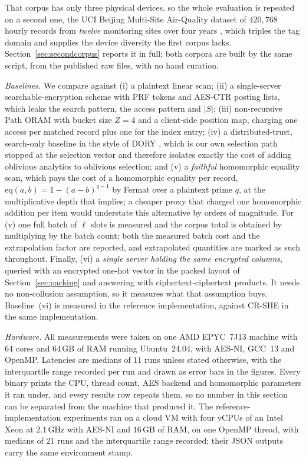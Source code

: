\documentclass[a4paper,fleqn]{cas-dc}
\begin{document}
That corpus has only three physical devices, so the whole evaluation is
repeated on a second one, the UCI Beijing Multi-Site Air-Quality dataset of
$420{,}768$ hourly records from \emph{twelve} monitoring sites over four years
\citep{zhang2017cautionary}, which triples the tag domain and supplies the
device diversity the first corpus lacks. Section~\ref{sec:secondcorpus}
reports it in full; both corpora are built by the same script, from the
published raw files, with no hand curation.

\emph{Baselines.} We compare against (i) a plaintext linear scan; (ii) a
single-server searchable-encryption scheme with PRF tokens and AES-CTR posting
lists, which leaks the search pattern, the access pattern and $|S|$; (iii)
non-recursive Path ORAM with bucket size $Z=4$ and a client-side position map,
charging one access per matched record plus one for the index entry; (iv) a
distributed-trust, search-only baseline in the style of DORY \citep{dory},
which is our own selection path stopped at the selection vector and therefore
isolates exactly the cost of adding oblivious analytics to oblivious
selection; and (v) a \emph{faithful} homomorphic equality scan, which pays the
cost of a homomorphic equality per record,
$\mathrm{eq}(a,b)=1-(a-b)^{q-1}$ by Fermat over a plaintext prime $q$, at the
multiplicative depth that implies; a cheaper proxy that charged one
homomorphic addition per item would understate this alternative by orders of
magnitude. For (v) one full batch of $\ell$ slots is measured and the corpus
total is obtained by multiplying by the batch count; both the measured batch
cost and the extrapolation factor are reported, and extrapolated quantities
are marked as such throughout. Finally, (vi) a \emph{single server holding the
same encrypted columns}, queried with an encrypted one-hot vector in the
packed layout of Section~\ref{sec:packing} and answering with
ciphertext-ciphertext products. It needs no non-collusion assumption, so it
measures what that assumption buys. Baseline~(vi) is measured in the reference
implementation, against CR-SHE in the same implementation.

\emph{Hardware.} All measurements were taken on one AMD EPYC~7J13 machine with
$64$ cores and $64$\,GB of RAM running Ubuntu~24.04, with AES-NI, GCC~13 and
OpenMP. Latencies are medians of $11$ runs unless stated otherwise, with the
interquartile range recorded per run and drawn as error bars in the
figures. Every binary prints the CPU, thread count, AES backend and
homomorphic parameters it ran under, and every results row repeats them, so no
number in this section can be separated from the machine that produced it.
The reference-implementation experiments ran on a cloud VM with four vCPUs of
an Intel Xeon at $2.1$\,GHz with AES-NI and $16$\,GB of RAM, on one OpenMP
thread, with medians of $21$ runs and the interquartile range recorded; their
JSON outputs carry the same environment stamp.
\end{document}
